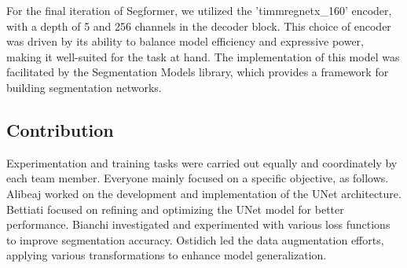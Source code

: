 \documentclass[11pt]{article}
\begin{document}
\begin{multicols}{2}
        For the final iteration of Segformer, we utilized the 'timm\-regnetx\_160' encoder, with a depth of 5 and 256 channels in the decoder block. This choice of encoder was driven by its ability to balance model efficiency and expressive power, making it well-suited for the task at hand. The implementation of this model was facilitated by the Segmentation Models library\cite{qubvel2024}, which provides a framework for building segmentation networks.

        \subsection{Contribution}

        Experimentation and training tasks were carried out equally and coordinately by each team member.
        Everyone mainly focused on a specific objective, as follows.
        Alibeaj worked on the development and implementation of the UNet architecture.
        Bettiati focused on refining and optimizing the UNet model for better performance.
        Bianchi investigated and experimented with various loss functions to improve segmentation accuracy.
        Ostidich led the data augmentation efforts, applying various transformations to enhance model generalization.

        
        

    \end{multicols}
\end{document}
